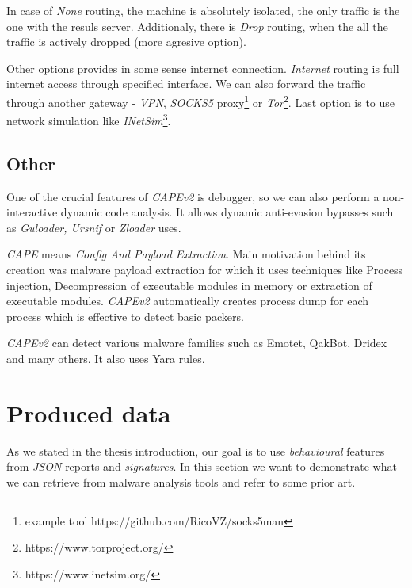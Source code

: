In case of \emph{None} routing, the machine is absolutely isolated, the only traffic is the one with the resuls server. Additionaly, there is \emph{Drop} routing, when the all the traffic is actively dropped (more agresive option). 

Other options provides in some sense internet connection. \emph{Internet} routing is full internet access through specified interface. We can also forward the traffic through another gateway - \emph{VPN}, \emph{SOCKS5} proxy\footnote{example tool https://github.com/RicoVZ/socks5man} or \emph{Tor}\footnote{https://www.torproject.org/}. Last option is to use network simulation like \emph{INetSim}\footnote{https://www.inetsim.org/}.

\subsection{Other}
One of the crucial features of \emph{CAPEv2} is debugger, so we can also perform a non-interactive dynamic code analysis. It allows dynamic anti-evasion bypasses such as \emph{Guloader, Ursnif} or \emph{Zloader} uses.

\emph{CAPE} means \emph{Config And Payload Extraction}. Main motivation behind its creation was malware payload extraction for which it uses techniques like Process injection, Decompression of executable modules in memory or extraction of executable modules. \emph{CAPEv2} automatically creates process dump for each process which is effective to detect basic packers.

\emph{CAPEv2} can detect various malware families such as Emotet, QakBot, Dridex and many others. It also uses Yara rules.


\section{Produced data}
As we stated in the thesis introduction, our goal is to use \emph{behavioural} features from \emph{JSON} reports and \emph{signatures}. In this section we want to demonstrate what we can retrieve from malware analysis tools and refer to some prior art.






